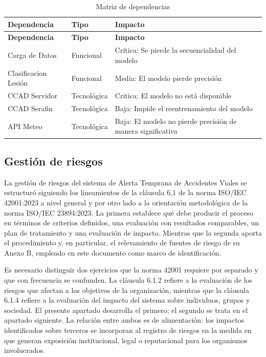 \begin{longtable}[]{@{}
>{\raggedright\arraybackslash}p{}
  >{\raggedright\arraybackslash}p{}
  >{\raggedright\arraybackslash}p{}@{}}
\caption{Matriz de dependencias}
\label{tab:matriz-de-dependencias}\\
\toprule\noalign{}
\textbf{Dependencia} & \textbf{Tipo} & \textbf{Impacto} \\
\midrule\noalign{}
\endfirsthead
\toprule\noalign{}
\textbf{Dependencia} & \textbf{Tipo} & \textbf{Impacto} \\
\midrule\noalign{}
\endhead
\bottomrule\noalign{}
\endlastfoot
Carga de Datos & Funcional & Crítica: Se pierde la secuencialidad del modelo \\
Clasificacion Lesión & Funcional & Media: El modelo pierde precisión \\
CCAD Servidor & Tecnológica & Critica: El modelo no está disponible \\
CCAD Serafin & Tecnológica & Baja: Impide el reentrenamiento del modelo \\
API Meteo & Tecnológica & Baja: El modelo no pierde precisión de manera significativa \\
\end{longtable}


\subsection{Gestión de riesgos}\label{gestiuxf3n-de-riesgos}

La gestión de riesgos del sistema de Alerta Temprana de Accidentes Viales se estructuró siguiendo los lineamientos de la cláusula 6,1 de la norma ISO/IEC 42001:2023 a nivel general y por otro lado a la orientación metodológica de la norma ISO/IEC 23894:2023. La primera establece qué debe producir el proceso en términos de criterios definidos, una evaluación con resultados comparables, un plan de tratamiento y una evaluación de impacto. Mientras que la segunda aporta el procedimiento y, en particular, el relevamiento de fuentes de riesgo de su Anexo B, empleado en este documento como marco de identificación.

Es necesario distinguir dos ejercicios que la norma 42001 requiere por separado y que con frecuencia se confunden. La cláusula 6.1.2 refiere a la evaluación de los riesgos que afectan a los objetivos de la organización, mientras que la cláusula 6.1.4 refiere a la evaluación del impacto del sistema sobre individuos, grupos y sociedad. El presente apartado desarrolla el primero; el segundo se trata en el apartado siguiente. La relación entre ambos es de alimentación: los impactos identificados sobre terceros se incorporan al registro de riesgos en la medida en que generan exposición institucional, legal o reputacional para los organismos involucrados.

